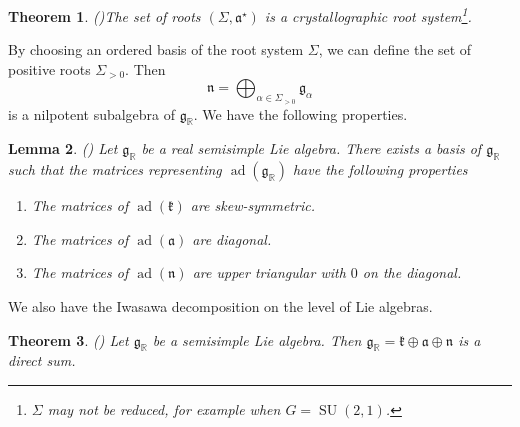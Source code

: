 \documentclass[12pt]{amsart}
\newcommand{\R}{\mathbb{R} }
\newcommand{\frakg}{\mathfrak{g}}
\newcommand{\frakk}{\mathfrak{k}}
\newcommand{\fraka}{\mathfrak{a}}
\newcommand{\frakn}{\mathfrak{n}}
\numberwithin{equation}{section}
\newtheorem{theorem}{Theorem}[section]
\newtheorem{lemma}[theorem]{Lemma}
\theoremstyle{remark} %
\begin{document}
\begin{theorem}(\cite[Corollary 6.53]{Kna})\label{thm:sigma_root}
	The set of roots $(\Sigma,\fraka^\star)$ is a crystallographic root system\footnote{$\Sigma$ may not be reduced, for example when $G= \operatorname{SU}(2,1)$.}.
\end{theorem}
By choosing an ordered basis of the root system $\Sigma$, we can define the set of positive roots $\Sigma_{>0}$. 
Then
$$
\frakn = \bigoplus_{\alpha \in \Sigma_{>0}} \frakg_\alpha
$$
is a nilpotent subalgebra of $\frakg_\R$. We have the following properties. 
\begin{lemma}\label{lem:kan_form}(\cite[Lemma 6.45]{Kna})
	Let $\frakg_\R$ be a real semisimple Lie algebra. There exists a basis of $\frakg_\R$ such that the matrices representing $\operatorname{ad}(\frakg_\R)$ have the following properties
	\begin{enumerate}
		\item The matrices of $\operatorname{ad}(\frakk)$ are skew-symmetric.
		\item The matrices of $\operatorname{ad}(\fraka)$ are diagonal.
		\item The matrices of $\operatorname{ad}(\frakn)$ are upper triangular with $0$ on the diagonal.
	\end{enumerate}
\end{lemma}
We also have the Iwasawa decomposition on the level of Lie algebras. 
\begin{theorem}(\cite[Proposition 6.43]{Kna})
	Let $\frakg_\R$ be a semisimple Lie algebra. Then $\frakg_\R = \frakk \oplus \fraka \oplus \frakn$ is a direct sum.
\end{theorem}
\end{document}
